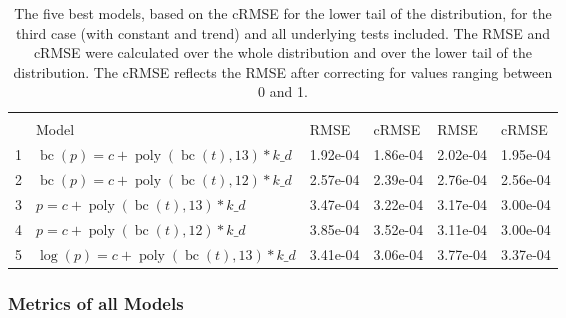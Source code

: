\documentclass[12pt,a4paper]{article}
\DeclareMathOperator{\bc}{bc}
\DeclareMathOperator{\poly}{poly}
\begin{document}
\begin{table}[!h]

\caption{\label{tab:5_best_all_3}\label{tab:best_all_3} The five best models, based on the cRMSE for the lower tail of the distribution, for the third case (with constant and trend) and all underlying tests included. The RMSE and cRMSE were calculated over the whole distribution and over the lower tail of the distribution. The cRMSE reflects the RMSE after correcting for values ranging between 0 and 1.}
\centering
\fontsize{10}{12}\selectfont
\begin{tabular}[t]{ll>{\raggedleft\arraybackslash}p{2cm}>{\raggedleft\arraybackslash}p{2cm}>{\raggedleft\arraybackslash}p{2cm}>{\raggedleft\arraybackslash}p{2cm}}
\toprule
\multicolumn{1}{c}{\textbf{}} & \multicolumn{1}{c}{\textbf{}} & \multicolumn{2}{c}{\textbf{Full Distribution}} & \multicolumn{2}{c}{\textbf{Lower Tail ($p \leq 0.2$)}} \\
\cmidrule(l{3pt}r{3pt}){3-4} \cmidrule(l{3pt}r{3pt}){5-6}
  & Model & RMSE & cRMSE & RMSE & cRMSE\\
\midrule
\rowcolor{gray!6}  1 & $\bc(p) = c + \poly\left( \bc(t), 13 \right) * k\_d$ & 1.92e-04 & 1.86e-04 & 2.02e-04 & 1.95e-04\\
2 & $\bc(p) = c + \poly\left( \bc(t), 12 \right) * k\_d$ & 2.57e-04 & 2.39e-04 & 2.76e-04 & 2.56e-04\\
\rowcolor{gray!6}  3 & $p = c + \poly\left( \bc(t), 13 \right) * k\_d$ & 3.47e-04 & 3.22e-04 & 3.17e-04 & 3.00e-04\\
4 & $p = c + \poly\left( \bc(t), 12 \right) * k\_d$ & 3.85e-04 & 3.52e-04 & 3.11e-04 & 3.00e-04\\
\rowcolor{gray!6}  5 & $\log(p) = c + \poly\left( \bc(t), 13 \right) * k\_d$ & 3.41e-04 & 3.06e-04 & 3.77e-04 & 3.37e-04\\
\bottomrule
\end{tabular}
\end{table}

\FloatBarrier

\hypertarget{metrics-of-all-models}{%
\subsubsection{Metrics of all Models}\label{metrics-of-all-models}}

\begingroup\fontsize{10}{12}\selectfont
\end{document}

